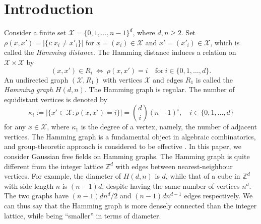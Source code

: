 \documentclass[a4paper,11pt]{article}
\theoremstyle{plain}
\theoremstyle{definition}
\begin{document}
\section{Introduction}
\label{sect:intr}

Consider a finite set $\mathcal{X}=\{0,1,\ldots,n-1\}^d$,
where $d,n\ge 2$. Set $\rho(x,x')=|\{i:x_i\neq x'_i\}|$
for $x=(x_i)\in\mathcal{X}$ and $x'=(x'_i)\in \mathcal{X}$,
which is called the {\it Hamming distance}. The Hamming
distance induces a relation on $\mathcal{X}\times \mathcal{X}$
by
\[
  (x,x')\in R_i ~ \Leftrightarrow ~ \rho(x,x')=i \quad
  \text{for} ~ i\in\{0,1,\ldots,d\}.
\]
An undirected graph $(\mathcal{X},R_1)$ with vertices
$\mathcal{X}$ and edges $R_1$ is called
the {\it Hamming graph} $H(d,n)$. The Hamming graph is
regular. The number of equidistant vertices is denoted by
\begin{equation}\label{deg}
  \kappa_i:=|\{x'\in \mathcal{X}:\rho(x,x')=i\}|
  =\binom{d}{i}(n-1)^i, \quad i\in\{0,1,\ldots,d\}
\end{equation}
for any $x\in\mathcal{X}$, where $\kappa_1$ is the degree
of a vertex, namely, the number of adjacent vertices.
The Hamming graph is a fundamental object in algebraic
combinatorics, and group-theoretic approach is considered
to be effective \cite{BBIT21}. In this paper, we consider
Gaussian free fields on Hamming graphs. The Hamming
graph is quite different from the integer lattice
$\mathbb{Z}^d$ with edges between nearest-neighbour
vertices. For example, the diameter of $H(d,n)$ is $d$,
while that of a cube in $\mathbb{Z}^d$ with side length
$n$ is $(n-1)d$, despite having the same number of
vertices $n^d$.
The two graphs have $(n-1)dn^d/2$ and $(n-1)dn^{d-1}$
edges respectively.
We can thus say that the Hamming graph is more densely
connected than the integer lattice, while being
``smaller'' in terms of diameter.
\end{document}
